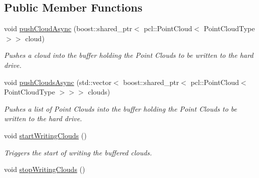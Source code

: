 \subsection*{Public Member Functions}
\begin{DoxyCompactItemize}
\item 
void \hyperlink{class_kinect_cloud_file_writer_ad983b3035813cc7e1ff9de989783b351}{push\+Cloud\+Async} (boost\+::shared\+\_\+ptr$<$ pcl\+::\+Point\+Cloud$<$ Point\+Cloud\+Type $>$$>$ cloud)
\begin{DoxyCompactList}\small\item\em Pushes a cloud into the buffer holding the Point Clouds to be written to the hard drive. \end{DoxyCompactList}\item 
void \hyperlink{class_kinect_cloud_file_writer_a2798609201757a1d05e0d138a9a9eb2b}{push\+Clouds\+Async} (std\+::vector$<$ boost\+::shared\+\_\+ptr$<$ pcl\+::\+Point\+Cloud$<$ Point\+Cloud\+Type $>$$>$$>$ clouds)
\begin{DoxyCompactList}\small\item\em Pushes a list of Point Clouds into the buffer holding the Point Clouds to be written to the hard drive. \end{DoxyCompactList}\item 
\hypertarget{class_kinect_cloud_file_writer_a1501ce3e57880c7391916dfe08659a5c}{}void \hyperlink{class_kinect_cloud_file_writer_a1501ce3e57880c7391916dfe08659a5c}{start\+Writing\+Clouds} ()\label{class_kinect_cloud_file_writer_a1501ce3e57880c7391916dfe08659a5c}

\begin{DoxyCompactList}\small\item\em Triggers the start of writing the buffered clouds. \end{DoxyCompactList}\item 
\hypertarget{class_kinect_cloud_file_writer_ad2e2ee4a0d8ba6c9707a1902762a58e9}{}void \hyperlink{class_kinect_cloud_file_writer_ad2e2ee4a0d8ba6c9707a1902762a58e9}{stop\+Writing\+Clouds} ()\label{class_kinect_cloud_file_writer_ad2e2ee4a0d8ba6c9707a1902762a58e9}


\end{DoxyCompactItemize}
